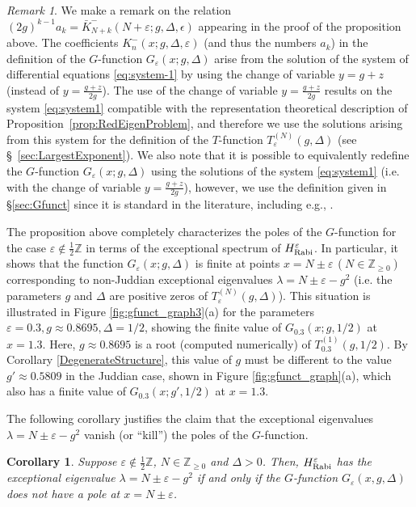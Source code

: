\documentclass[11pt]{article}
\numberwithin{equation}{section}
\newcommand{\Z}{\mathbb{Z}} %
\newcommand{\e}{\varepsilon}
\newcommand{\HRabi}[1]{H_{\text{\upshape Rabi}}^{#1}} %
\newcommand{\QEDhere}{\pushQED{\qed}\qedhere\popQED}
\theoremstyle{plain}
\newtheorem{cor}[thm]{Corollary}
\theoremstyle{definition}
\theoremstyle{remark}
\newtheorem{rem}{Remark}[section]
\begin{document}
\begin{rem}
We make a remark on the relation \((2g)^{k-1} a_k  = \bar{K}_{N+k}^{-}(N+\e;g,\Delta,\epsilon) \) appearing in the proof of the
proposition above. The coefficients \(K_n^{-}(x;g,\Delta,\e) \) (and thus the numbers \(a_k\)) in the definition of the
$G$-function \(G_\e(x;g,\Delta) \) arise from the solution of the system of differential equations \eqref{eq:system-1} by using the change of
variable \(y = g + z \) (instead of \(y = \frac{g+z}{2 g} \)). The use of the change of variable \(y = \frac{g+z}{2 g} \) results on the
system \eqref{eq:system1} compatible with the representation theoretical description of Proposition~\ref{prop:RedEigenProblem}, and
therefore we use the solutions arising from this system for the definition of the $T$-function \(T^{(N)}_\e(g,\Delta)\) (see \S~\ref{sec:LargestExponent}).
We also note that it is possible to equivalently redefine the $G$-function \(G_\e(x;g,\Delta) \) using the solutions of the system \eqref{eq:system1}
(i.e. with the change of variable \(y = \frac{g+z}{2 g} \)), however, we use the definition given in \S\ref{sec:Gfunct} since it is standard
in the literature, including e.g., \cite{B2011PRL,LB2015JPA,Le2016}.
\end{rem}

The proposition above completely characterizes the poles of the $G$-function for the case \(\e \not\in \frac12 \Z \)
in terms of the exceptional spectrum of \(\HRabi{\e}\). In particular, it shows that the function \(G_\e(x;g,\Delta) \) is finite at
points \(x = N \pm \e \, (N \in \Z_{\geq 0})\) corresponding to non-Juddian exceptional eigenvalues \(\lambda = N \pm \e - g^2\) (i.e. the parameters
\(g\) and \(\Delta\) are positive zeros of \(T_\e^{(N)}(g,\Delta)\)). This situation is illustrated in Figure \ref{fig:gfunct_graph3}(a) for the
parameters \(\e = 0.3, g \approx 0.8695, \Delta = 1/2\), showing the finite value of \(G_{0.3}(x;g,1/2) \) at \(x = 1.3 \). Here, \(g \approx 0.8695\) is a
root (computed numerically) of \(T_{0.3}^{(1)}(g,1/2)\). By Corollary \ref{DegenerateStructure}, this value of \(g\) must be different to the
value \(g' \approx 0.5809 \) in the Juddian case, shown in Figure \ref{fig:gfunct_graph}(a), which also has a finite value of \(G_{0.3}(x;g',1/2)\)
at \(x = 1.3 \).

The following corollary justifies the claim that the exceptional eigenvalues \(\lambda = N \pm \e - g^2\) vanish (or ``kill'') the poles
of the $G$-function.

\begin{cor}
  Suppose \(\e \not\in \frac12 \Z \), \(N \in \Z_{\geq 0} \) and \(\Delta>0 \). Then, \(\HRabi{\e}\) has the exceptional
  eigenvalue \( \lambda = N \pm \e - g^2\) if and only if the $G$-function \(G_{\e}(x,g,\Delta) \) does not have a pole at \(x = N \pm \e\). \QEDhere
\end{cor}
\end{document}
